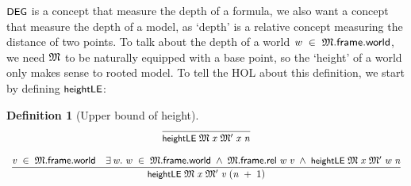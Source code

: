 \documentclass[letterpaper]{article}
\newtheorem{defn}{Definition}
\renewcommand{\HOLConst}[1]{{\textsf{\upshape\small #1}}}
\renewcommand{\HOLinline}[1]{\ensuremath{#1}}
\begin{document}
\HOLinline{\HOLConst{DEG}} is a concept that measure the depth of a formula, we also want a concept that measure the depth of a model, as `depth' is a relative concept measuring the distance of two points. To talk about the depth of a world \HOLinline{\HOLFreeVar{w}\;\HOLSymConst{\HOLTokenIn{}}\;\HOLFreeVar{\ensuremath{\mathfrak{M}}}.\HOLFieldName{frame}.\HOLFieldName{world}}, we need \HOLinline{\HOLFreeVar{\ensuremath{\mathfrak{M}}}} to be naturally equipped with a base point, so the `height' of a world only makes sense to rooted model. To tell the HOL about this definition, we start by defining \HOLinline{\HOLConst{heightLE}}:


\begin{defn}[Upper bound of height]
\[
\begin{array}{c}
  \infer{\HOLinline{\HOLConst{heightLE}\;\HOLFreeVar{\ensuremath{\mathfrak{M}}}\;\HOLFreeVar{x}\;\HOLFreeVar{\ensuremath{\mathfrak{M}'}}\;\HOLFreeVar{x}\;\HOLFreeVar{n}}}{}\\[4mm]
  \infer{\HOLinline{\HOLConst{heightLE}\;\HOLFreeVar{\ensuremath{\mathfrak{M}}}\;\HOLFreeVar{x}\;\HOLFreeVar{\ensuremath{\mathfrak{M}'}}\;\HOLFreeVar{v}\;(\HOLFreeVar{n}\;\HOLSymConst{\ensuremath{+}}\;\HOLNumLit{1})}}{\HOLinline{\HOLFreeVar{v}\;\HOLSymConst{\HOLTokenIn{}}\;\HOLFreeVar{\ensuremath{\mathfrak{M}}}.\HOLFieldName{frame}.\HOLFieldName{world}}&\HOLinline{\HOLSymConst{\HOLTokenExists{}}\HOLBoundVar{w}.\;\HOLBoundVar{w}\;\HOLSymConst{\HOLTokenIn{}}\;\HOLFreeVar{\ensuremath{\mathfrak{M}}}.\HOLFieldName{frame}.\HOLFieldName{world}\;\HOLSymConst{\HOLTokenConj{}}\;\HOLFreeVar{\ensuremath{\mathfrak{M}}}.\HOLFieldName{frame}.\HOLFieldName{rel}\;\HOLBoundVar{w}\;\HOLFreeVar{v}\;\HOLSymConst{\HOLTokenConj{}}\;\HOLConst{heightLE}\;\HOLFreeVar{\ensuremath{\mathfrak{M}}}\;\HOLFreeVar{x}\;\HOLFreeVar{\ensuremath{\mathfrak{M}'}}\;\HOLBoundVar{w}\;\HOLFreeVar{n}}}\\
\end{array}
\]
\end{defn}
\end{document}
